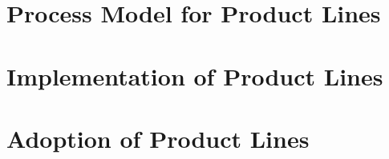 \documentclass[
	aspectratio=169, %
	8pt, %
]{beamer}
\subtitle{8. Development Process}
\author{Thomas Thüm, Elias Kuiter, Timo Kehrer}
\begin{document}


\section{Process Model for Product Lines}



\lessonslearned{
	\item \ldots
}{
	\item \ldots
}{
	\ldots
}

\sectionend

\section{Implementation of Product Lines}




\sectionend

\section{Adoption of Product Lines}



\lessonslearned{
	\item \ldots
}{
	\item \ldots
}{
	\ldots
}

\begin{frame}{\inserttitle}
	\lectureseriesoverview[II]
\end{frame}


\end{document}
